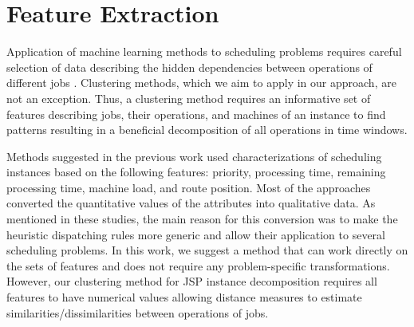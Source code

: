 \documentclass[runningheads]{llncs}
\begin{document}
\section{Feature Extraction}
\label{sec:features}
Application of machine learning methods to scheduling problems requires careful selection of data describing the hidden dependencies between operations of different jobs \cite{ismail2012production,nasiri2019data}. Clustering methods, which we aim to apply in our approach, are not an exception. Thus, a clustering method requires an informative set of features describing jobs, their operations, and machines of an instance to find patterns resulting in a beneficial decomposition of all operations in time windows. 

Methods suggested in the previous work \cite{koonce2000using, harrath2002genetic, shahzad2010discovering, ismail2012production, adibi2014clustering, nasiri2019data} used characterizations of scheduling instances based on the following features: priority, processing time, remaining processing time, machine load, and route position. 
Most of the approaches converted the quantitative values of the attributes into qualitative data. As mentioned in these studies, the main reason for this conversion was to make the heuristic dispatching rules more generic and allow their application to several scheduling problems. 
In this work, we suggest a method that can work directly on the sets of features and does not require any problem-specific transformations. However, our clustering method for JSP instance decomposition requires all features to have numerical values allowing distance measures to estimate similarities/dissimilarities between operations of jobs.
\end{document}
